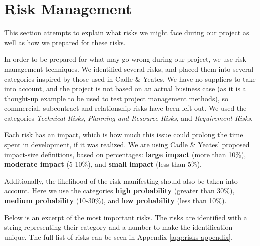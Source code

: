 \section{Risk Management}
This section attempts to explain what risks we might face during our project as well as how we prepared for these risks.
\label{sec:EmpiriRiskManagement}
\label{sec:RiskManagement}

In order to be prepared for what may go wrong during our project, we use risk management techniques.
We identified several risks, and placed them into several categories inspired by those used in Cadle
\& Yeates\cite{caye}. We have no suppliers to take into account, and the project is not
based on an actual business case (as it is a thought-up example to be used to test project management
methods), so commercial, subcontract and relationship risks have been left out. We used the categories
\emph{Technical Risks}, \emph{Planning and Resource Risks}, and \emph{Requirement Risks}.

Each risk has an impact, which is how much this issue could prolong the time spent in development,
if it was realized. We are using Cadle \& Yeates' proposed impact-size definitions, based on percentages:
\textbf{large impact} (more than 10\%), \textbf{moderate impact} (5-10\%), and \textbf{small impact}
(less than 5\%).

Additionally, the likelihood of the risk manifesting should also be taken into account. Here we use the
categories \textbf{high probability} (greater than 30\%), \textbf{medium probability} (10-30\%), and
\textbf{low probability} (less than 10\%).

Below is an excerpt of the most important risks. The risks are
identified with a string representing their category and a number to make the identification unique. The
full list of risks can be seen in Appendix \ref{app:risks-appendix}.

